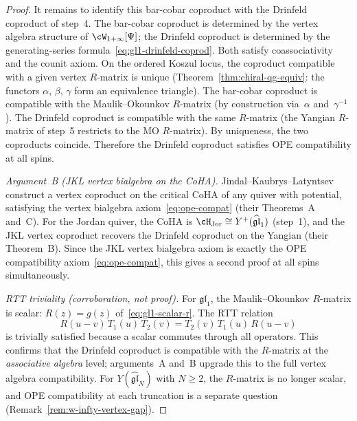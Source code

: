 \begin{proof}
It remains to identify this bar-cobar coproduct with the
Drinfeld coproduct of step~4. The bar-cobar coproduct
is determined by the vertex algebra structure of
$\cW_{1+\infty}[\Psi]$; the Drinfeld coproduct is
determined by the generating-series
formula~\eqref{eq:gl1-drinfeld-coprod}. Both satisfy
coassociativity and the counit axiom. On the ordered Koszul locus,
the coproduct compatible with a given vertex $R$-matrix is
unique (Theorem~\ref{thm:chiral-qg-equiv}: the functors
$\alpha$, $\beta$, $\gamma$ form an equivalence triangle).
The bar-cobar coproduct is compatible with the
Maulik--Okounkov $R$-matrix (by construction via~$\alpha$
and~$\gamma^{-1}$). The Drinfeld coproduct is compatible
with the same $R$-matrix (the Yangian $R$-matrix of
step~5 restricts to the MO $R$-matrix). By uniqueness,
the two coproducts coincide. Therefore the Drinfeld
coproduct satisfies OPE compatibility at all spins.

\smallskip
\noindent\emph{Argument~B \textup{(}JKL vertex bialgebra
on the CoHA\textup{)}.}
Jindal--Kaubrys--Latyntsev~\cite{JKL26} construct a vertex
coproduct on the critical CoHA of any quiver with potential,
satisfying the vertex bialgebra
axiom~\eqref{eq:ope-compat} (their Theorems~A and~C).
For the Jordan quiver, the CoHA is
$\cH_{\mathrm{Jor}} \cong Y^+(\widehat{\mathfrak{gl}}_1)$
(step~1), and the JKL vertex coproduct recovers the
Drinfeld coproduct on the Yangian (their Theorem~B).
Since the JKL vertex bialgebra axiom is exactly the OPE
compatibility axiom~\eqref{eq:ope-compat}, this gives a
second proof at all spins simultaneously.

\smallskip
\noindent\emph{RTT triviality \textup{(}corroboration,
not proof\textup{)}.}
For $\mathfrak{gl}_1$, the Maulik--Okounkov $R$-matrix is
scalar:
$R(z) = g(z)$ of~\eqref{eq:gl1-scalar-r}. The RTT
relation
\begin{equation}\label{eq:rtt-gl1}
 R(u - v)\, T_1(u)\, T_2(v)
 = T_2(v)\, T_1(u)\, R(u - v)
\end{equation}
is trivially satisfied because a scalar commutes through
all operators. This confirms that the Drinfeld coproduct is
compatible with the $R$-matrix at the \emph{associative
algebra} level; arguments~A and~B upgrade this to the
full vertex algebra compatibility.
For $Y(\widehat{\mathfrak{gl}}_N)$ with $N \geq 2$,
the $R$-matrix is no longer scalar, and OPE compatibility
at each truncation is a separate question
(Remark~\ref{rem:w-infty-vertex-gap}).


\end{proof}
